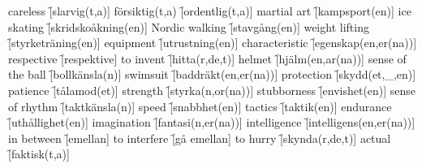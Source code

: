 \begin{questions}
\begin{multicols}{2}
        \question careless \f[slarvig(t,a)]
        \question försiktig(t,a) \f[ordentlig(t,a)]
        \question martial art \f[kampsport(en)]
        \question ice skating \f[skridskoåkning(en)]
        \question Nordic walking \f[stavgång(en)]
        \question weight lifting \f[styrketräning(en)]
        \question equipment \f[utrustning(en)]
        \question characteristic \f[egenskap(en,er(na))]
        \question respective \f[respektive]
        \question to invent \f[hitta(r,de,t)]
        \question helmet \f[hjälm(en,ar(na))]
        \question sense of the ball \f[bollkänsla(n)]
        \question swimsuit \f[baddräkt(en,er(na))]
        \question protection \f[skydd(et,\_,en)]
        \question patience \f[tålamod(et)]
        \question strength \f[styrka(n,or(na))]
        \question stubborness \f[envishet(en)]
        \question sense of rhythm \f[taktkänsla(n)]
        \question speed \f[snabbhet(en)]
        \question tactics \f[taktik(en)]
        \question endurance \f[uthållighet(en)]
        \question imagination \f[fantasi(n,er(na))]
        \question intelligence \f[intelligens(en,er(na))]
        \question in between \f[emellan]
        \question to interfere \f[gå emellan]
        \question to hurry \f[skynda(r,de,t)]
        \question actual \f[faktisk(t,a)]
    \end{multicols}
\end{questions}

